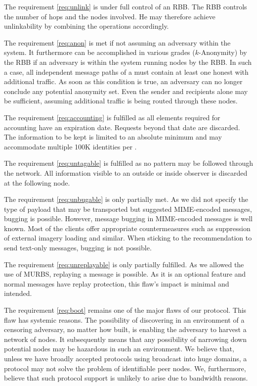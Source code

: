 The requirement \ref{req:unlink} is under full control of an RBB. The RBB controls the number of hops and the nodes involved. He may therefore achieve unlinkability by combining the operations accordingly.

The requirement \ref{req:anon} is met if not assuming an adversary within the system. It furthermore can be accomplished in various grades ($k$-Anonymity) by the RBB if an adversary is within the system running nodes by the RBB. In such a case, all independent message paths of a \VortexMessage{} must contain at least one honest \VortexNode{} with additional traffic. As soon as this condition is true, an adversary can no longer conclude any potential anonymity set. Even the sender and recipients alone may be sufficient, assuming additional traffic is being routed through these nodes.

The requirement \ref{req:accounting} is fulfilled as all elements required for accounting have an expiration date. Requests beyond that date are discarded. The information to be kept is limited to an absolute minimum and may accommodate multiple 100K identities per \VortexNode.

The requirement \ref{req:untagable} is fulfilled as no pattern may be followed through the network. All information visible to an outside or inside observer is discarded at the following node.

The requirement \ref{req:unbugable} is only partially met. As we did not specify the type of payload that may be transported but suggested MIME-encoded messages, bugging is possible. However, message bugging in MIME-encoded messages is well known. Most of the clients offer appropriate countermeasures such as suppression of external imagery loading and similar. When sticking to the recommendation to send text-only messages, bugging is not possible.

The requirement \ref{req:unreplayable} is only partially fulfilled. As we allowed the use of MURBS, replaying a message is possible. As it is an optional feature and normal messages have replay protection, this flaw's impact is minimal and intended.

The requirement \ref{req:boot} remains one of the major flaws of our protocol. This flaw has systemic reasons. The possibility of discovering \VortexNodes{} in an environment of a censoring adversary, no matter how built, is enabling the adversary to harvest a network of nodes. It subsequently means that any possibility of narrowing down potential nodes may be hazardous in such an environment. We believe that, unless we have broadly accepted protocols using broadcast into huge domains, a protocol may not solve the problem of identifiable peer nodes. We, furthermore, believe that such protocol support is unlikely to arise due to bandwidth reasons. 

